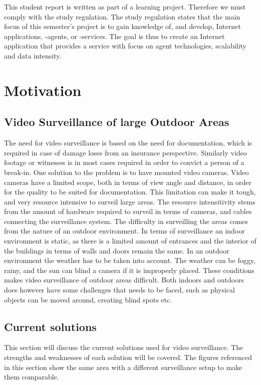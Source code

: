 This student report is written as part of a learning project. Therefore we must comply with the study regulation.
The study regulation states that the main focus of this semester's project is to gain knowledge of, and develop, Internet applications, -agents, or -services.
The goal is thus to create an Internet application that provides a service with focus on agent technologies, scalability and data intensity.
\section{Motivation}

\subsection{Video Surveillance of large Outdoor Areas}
The need for video surveillance is based on the need for documentation, which is required in case of damage loses from an insurance perspective.
Similarly video footage or witnesses is in most cases required in order to convict a person of a break-in.
One solution to the problem is to have mounted video cameras.
Video cameras have a limited scope, both in terms of view angle and distance, in order for the quality to be suited for documentation.
This limitation can make it tough, and very resource intensive to surveil large areas.
The resource intensitivity stems from the amount of hardware required to surveil in terms of cameras, and cables connecting the surveillance system.
The difficulty in surveilling the areas comes from the nature of an outdoor environment.
In terms of surveillance an indoor environment is static, as there is a limited amount of entrances and the interior of the buildings in terms of walls and doors remain the same.
In an outdoor environment the weather has to be taken into account.
The weather can be foggy, rainy, and the sun can blind a camera if it is improperly placed.
These conditions makes video surveillance of outdoor areas difficult.
Both indoors and outdoors does however have some challenges that needs to be faced, such as physical objects can be moved around, creating blind spots etc.

\subsection{Current solutions}
This section will discuss the current solutions used for video surveillance.
The strengths and weaknesses of each solution will be covered.
The figures referenced in this section show the same area with a different surveillance setup to make them comparable.
